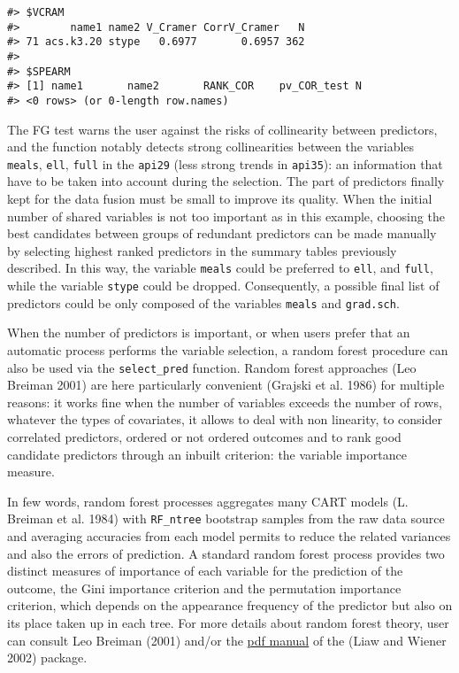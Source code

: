 \begin{verbatim}
#> $VCRAM
#>        name1 name2 V_Cramer CorrV_Cramer   N
#> 71 acs.k3.20 stype   0.6977       0.6957 362
#> 
#> $SPEARM
#> [1] name1       name2       RANK_COR    pv_COR_test N          
#> <0 rows> (or 0-length row.names)
\end{verbatim}

The FG test warns the user against the risks of collinearity between predictors, and the function notably detects strong collinearities between the variables \texttt{meals}, \texttt{ell}, \texttt{full} in the \texttt{api29} (less strong trends in \texttt{api35}): an information that have to be taken into account during the selection. The part of predictors finally kept for the data fusion must be small to improve its quality. When the initial number of shared variables is not too important as in this example, choosing the best candidates between groups of redundant predictors can be made manually by selecting highest ranked predictors in the summary tables previously described. In this way, the variable \texttt{meals} could be preferred to \texttt{ell}, and \texttt{full}, while the variable \texttt{stype} could be dropped. Consequently, a possible final list of predictors could be only composed of the variables \texttt{meals} and \texttt{grad.sch}.

When the number of predictors is important, or when users prefer that an automatic process performs the
variable selection, a random forest procedure can also be used via the \texttt{select\_pred} function. Random forest approaches (Leo Breiman 2001) are here particularly convenient (Grajski et al. 1986) for multiple reasons: it works fine when the number of variables exceeds the number of rows, whatever the types of covariates, it allows to deal with non linearity, to consider correlated predictors, ordered or not ordered outcomes and to rank good candidate predictors through an inbuilt criterion: the variable importance measure.

In few words, random forest processes aggregates many CART models (L. Breiman et al. 1984) with
\texttt{RF\_ntree} bootstrap samples from the raw data source and averaging accuracies from each model permits to reduce the related variances and also the errors of prediction. A standard random forest process provides two distinct measures of importance of each variable for the prediction of the outcome, the Gini importance criterion and the permutation importance criterion, which depends on the appearance frequency of the predictor but also on its place taken up in each tree. For more details about random forest theory, user can consult Leo Breiman (2001) and/or the \href{https://cran.r-project.org//web//packages//randomForest//randomForest.pdf}{pdf manual} of the  (Liaw and Wiener 2002) package.

